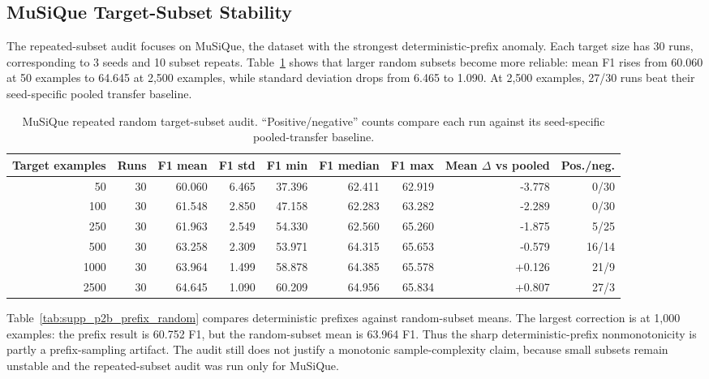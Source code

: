 \documentclass[conference]{IEEEtran}
\begin{document}
\subsection{MuSiQue Target-Subset Stability}

The repeated-subset audit focuses on MuSiQue, the dataset with the strongest deterministic-prefix anomaly. Each target size has 30 runs, corresponding to 3 seeds and 10 subset repeats. Table~\ref{tab:supp_p2b_random_subset} shows that larger random subsets become more reliable: mean F1 rises from 60.060 at 50 examples to 64.645 at 2,500 examples, while standard deviation drops from 6.465 to 1.090. At 2,500 examples, 27/30 runs beat their seed-specific pooled transfer baseline.

\begin{table}[t]
\caption{MuSiQue repeated random target-subset audit. ``Positive/negative'' counts compare each run against its seed-specific pooled-transfer baseline.}
\label{tab:supp_p2b_random_subset}
\centering
\scriptsize
\setlength{\tabcolsep}{4pt}
\begin{tabular}{rrrrrrrrr}
\toprule
Target examples & Runs & F1 mean & F1 std & F1 min & F1 median & F1 max & Mean $\Delta$ vs pooled & Pos./neg. \\
\midrule
50 & 30 & 60.060 & 6.465 & 37.396 & 62.411 & 62.919 & -3.778 & 0/30 \\
100 & 30 & 61.548 & 2.850 & 47.158 & 62.283 & 63.282 & -2.289 & 0/30 \\
250 & 30 & 61.963 & 2.549 & 54.330 & 62.560 & 65.260 & -1.875 & 5/25 \\
500 & 30 & 63.258 & 2.309 & 53.971 & 64.315 & 65.653 & -0.579 & 16/14 \\
1000 & 30 & 63.964 & 1.499 & 58.878 & 64.385 & 65.578 & +0.126 & 21/9 \\
2500 & 30 & 64.645 & 1.090 & 60.209 & 64.956 & 65.834 & +0.807 & 27/3 \\
\bottomrule
\end{tabular}
\end{table}

Table~\ref{tab:supp_p2b_prefix_random} compares deterministic prefixes against random-subset means. The largest correction is at 1,000 examples: the prefix result is 60.752 F1, but the random-subset mean is 63.964 F1. Thus the sharp deterministic-prefix nonmonotonicity is partly a prefix-sampling artifact. The audit still does not justify a monotonic sample-complexity claim, because small subsets remain unstable and the repeated-subset audit was run only for MuSiQue.
\end{document}
